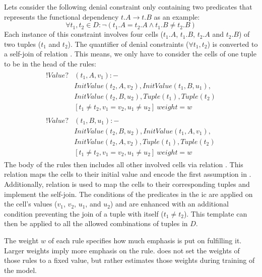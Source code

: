   Lets consider the following denial constraint only containing two predicates that represents the functional dependency $t.A \to t.B$ as an example:
  \begin{equation}
    \forall t_1, t_2 \in D: \neg(t_1.A = t_2.A \land t_1.B \neq t_2.B)
  \end{equation}
  Each instance of this constraint involves four cells ($t_1.A$, $t_1.B$, $t_2.A$ and $t_2.B$) of two tuples ($t_1$ and $t_2$).
  The quantifier of denial constraints ($\forall t_1, t_2$) is converted to a self-join of relation .
  This means, we only have to consider the cells of one tuple to be in the head of the rules:
  \begin{align}
    \begin{split}
      !Value?&(t_1,A,v_1):-\\
      &InitValue(t_2,A,v_2), InitValue(t_1,B,u_1),\\
      &InitValue(t_2,B,u_2), Tuple(t_1), Tuple(t_2)\\
      &[t_1 \neq t_2, v_1 = v_2, u_1 \neq u_2]\ weight=w%
    \end{split}\\
    \begin{split}
      !Value?&(t_1,B,u_1):-\\
      &InitValue(t_2,B,u_2), InitValue(t_1,A,v_1),\\
      &InitValue(t_2,A,v_2), Tuple(t_1), Tuple(t_2)\\
      &[t_1 \neq t_2, v_1 = v_2, u_1 \neq u_2]\ weight=w%
    \end{split}
  \end{align}
  The body of the rules then includes all other involved cells via relation .
  This relation maps the cells to their initial value and encode the first assumption in \ddlog.
  Additionally, relation  is used to map the cells to their corresponding tuples and implement the self-join.
  The conditions of the predicates in the \gls{ic} are applied on the cell's values ($v_1$, $v_2$, $u_1$, and $u_2$) and are enhanced with an additional condition preventing the join of a tuple with itself ($t_1 \neq t_2$).
  This template can then be applied to all the allowed combinations of tuples in $D$.
  
  The weight $w$ of each rule specifies how much emphasis is put on fulfilling it.
  Larger weights imply more emphasis on the rule.
  \holoclean{} does not set the weights of those rules to a fixed value, but rather estimates those weights during training of the model.
  
